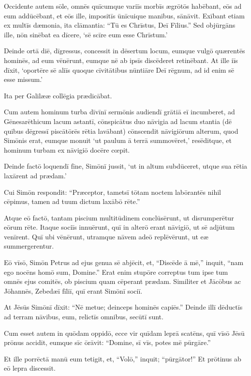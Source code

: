 \Versus Occidente autem sōle, omnēs quīcumque variīs morbīs ægrōtōs habēbant, eōs ad eum addūcēbant, et eōs ille, impositīs ūnīcuique manibus, sānāvit.
\Versus Exībant etiam ex multīs dæmonia, ita clāmantia: ``Tū es Chrīstus, Deī Fīlius.'' Sed objūrgāns ille, nōn sinēbat ea dīcere, `sē scīre eum esse Chrīstum.'

\Versus Deinde ortā diē, dīgressus, concessit in dēsertum locum, eumque vulgō quærentēs hominēs, ad eum vēnērunt, eumque nē ab ipsīs discēderet retinēbant.
\Versus At ille iīs dīxit, `oportēre sē aliīs quoque cīvitātibus nūntiāre Deī rēgnum, ad id enim sē esse missum.'

\Versus Ita per Galilææ collēgia prædicābat.



\Caput
\Versus Cum autem hominum turba dīvīnī sermōnis audiendī grātiā eī incumberet, ad Gēnesarēthicum lacum astantī,
\Versus cōnspicātus duo nāvigia ad lacum stantia (dē quibus dēgressī piscātōrēs rētia lavābant) cōnscendit nāvigiōrum alterum, quod Simōnis erat,
\Versus eumque monuit `ut paulum ā terrā summovēret,' resēditque, et hominum turbam ex nāvigiō docēre cœpit.

\Versus Deinde factō loquendī fīne, Simōnī jussit, `ut in altum subdūceret, utque sua rētia laxārent ad prædam.'

\Versus Cui Simōn respondit: ``Præceptor, tametsī tōtam noctem labōrantēs nihil cēpimus, tamen ad tuum dictum laxābō rēte.''

\Versus Atque eō factō, tantam piscium multitūdinem conclūsērunt, ut disrumperētur eōrum rēte.
\Versus Itaque sociīs innuērunt, quī in alterō erant nāvigiō, ut sē adjūtum venīrent. Quī ubi vēnērunt, utramque nāvem adeō replēvērunt, ut eæ summergerentur.

\Versus Eō vīsō, Simōn Petrus ad ejus genua sē abjēcit, et, ``Discēde ā mē,'' inquit, ``nam ego nocēns homō sum, Domine.''
\Versus Erat enim stupōre correptus tum ipse tum omnēs ejus comitēs, ob piscium quam cēperant prædam.
\Versus Similiter et Jācōbus ac Jōhannēs, Zebedæī fīliī, quī erant Simōnī sociī.

 At Jēsūs Simōnī dīxit: ``Nē metue; deinceps hominēs capiēs.''
\Versus Deinde illī dēductīs ad terram nāvibus, eum, relictīs omnibus, secūtī sunt.

\Versus Cum esset autem in quōdam oppidō, ecce vir quīdam leprā scatēns, quī vīsō Jēsū prōnus accidit, eumque sīc ōrāvit: ``Domine, sī vīs, potes mē pūrgāre.''

\Versus Et ille porrēctā manū eum tetigit, et, ``Volō,'' inquit; ``pūrgātor!'' Et prōtinus ab eō lepra discessit.

